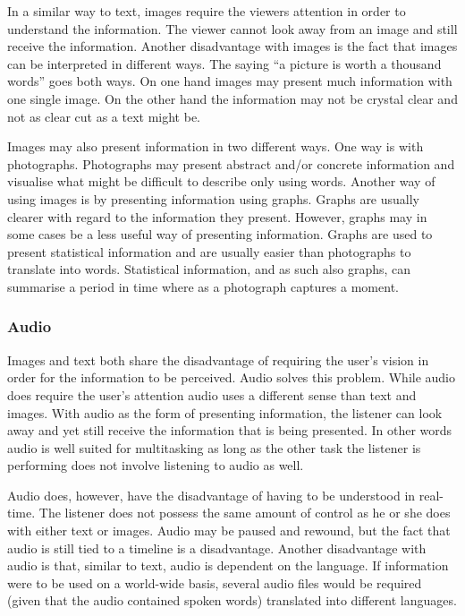 In a similar way to text, images require the viewers attention in order to understand the information. The viewer cannot look away from an image and still receive the information. Another disadvantage with images is the fact that images can be interpreted in different ways. The saying ``a picture is worth a thousand words'' goes both ways. On one hand images may present much information with one single image. On the other hand the information may not be crystal clear and not as clear cut as a text might be.

Images may also present information in two different ways. One way is with photographs. Photographs may present abstract and/or concrete information and visualise what might be difficult to describe only using words. Another way of using images is by presenting information using graphs. Graphs are usually clearer with regard to the information they present. However, graphs may in some cases be a less useful way of presenting information. Graphs are used to present statistical information and are usually easier than photographs to translate into words. Statistical information, and as such also graphs, can summarise a period in time where as a photograph captures a moment. 

\subsubsection{Audio}
Images and text both share the disadvantage of requiring the user's vision in order for the information to be perceived. Audio solves this problem. While audio does require the user's attention audio uses a different sense than text and images. With audio as the form of presenting information, the listener can look away and yet still receive the information that is being presented. In other words audio is well suited for multitasking as long as the other task the listener is performing does not involve listening to audio as well.

Audio does, however, have the disadvantage of having to be understood in real-time. The listener does not possess the same amount of control as he or she does with either text or images. Audio may be paused and rewound, but the fact that audio is still tied to a timeline is a disadvantage. Another disadvantage with audio is that, similar to text, audio is dependent on the language. If information were to be used on a world-wide basis, several audio files would be required (given that the audio contained spoken words) translated into different languages.

